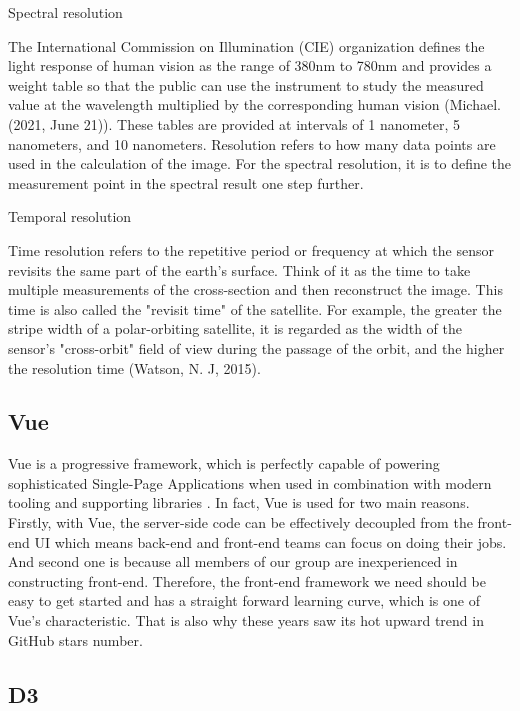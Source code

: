 \documentclass[conference]{IEEEtran}
\newcommand{\subparagraph}{}
\begin{document}
\subparagraph{Spectral resolution} 

The International Commission on Illumination (CIE) organization defines the light response of human vision as the range of 380nm to 
780nm and provides a weight table so that the public can use the instrument to study the measured value at the wavelength multiplied 
by the corresponding human vision (Michael. (2021, June 21)). These tables are provided at intervals of 1 nanometer, 5 nanometers, 
and 10 nanometers. Resolution refers to how many data points are used in the calculation of the image. For the spectral resolution, 
it is to define the measurement point in the spectral result one step further.


\subparagraph{Temporal resolution} 

Time resolution refers to the repetitive period or frequency at which the sensor revisits the same part of the earth's 
surface. Think of it as the time to take multiple measurements of the cross-section and then reconstruct the image. This 
time is also called the "revisit time" of the satellite. For example, the greater the stripe width of a polar-orbiting 
satellite, it is regarded as the width of the sensor's "cross-orbit" field of view during the passage of the orbit, and 
the higher the resolution time (Watson, N. J, 2015).


\subsection{Vue}

Vue is a progressive framework, which is perfectly capable of powering sophisticated Single-Page Applications when used 
in combination with modern tooling and supporting libraries \cite{Introduc89:online}. In fact, Vue is used for two main reasons. Firstly, 
with Vue, the server-side code can be effectively decoupled from the front-end UI which means back-end and front-end 
teams can focus on doing their jobs. And second one is because all members of our group are inexperienced in constructing 
front-end. Therefore, the front-end framework we need should be easy to get started and has a straight forward learning 
curve, which is one of Vue’s characteristic. That is also why these years saw its hot upward trend in GitHub stars number.

\subsection{D3}
\end{document}
